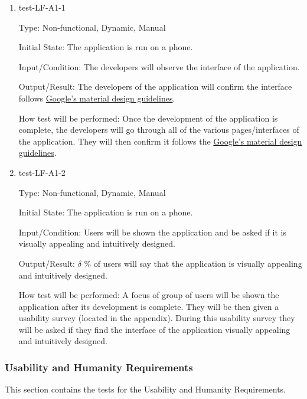\documentclass[12pt, titlepage]{article}
\begin{document}
\begin{enumerate}

\item{test-LF-A1-1\\}

Type: Non-functional, Dynamic, Manual 
					
Initial State: The application is run on a phone.
					
Input/Condition: The developers will observe the interface of the application. 
					
Output/Result: The developers of the application will confirm the interface follows \href{https://m3.material.io/foundations}{Google's material design guidelines}. 
					
How test will be performed: Once the development of the application is complete, the developers will go through all of the various pages/interfaces of the application. They will then confirm it follows the \href{https://m3.material.io/foundations}{Google's material design guidelines}.

\item{test-LF-A1-2\\}

Type: Non-functional, Dynamic, Manual 
					
Initial State: The application is run on a phone.
					
Input/Condition: Users will be shown the  application and be asked if it is visually appealing and intuitively designed. 
					
Output/Result: $\delta$ \% of users will say that the application is visually appealing and intuitively designed. 
					
How test will be performed: A focus of group of users will be shown the application after its development is complete. They will be then given a usability survey (located in the appendix). During this usability survey they will be asked if they find the interface of the application visually appealing and intuitively designed.
					

\end{enumerate}

\subsubsection{Usability and Humanity Requirements}

This section contains the tests for the Usability and Humanity Requirements.
		
\end{document}
